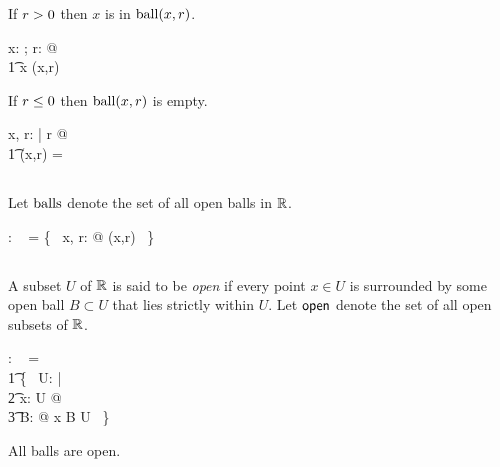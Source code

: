 \documentclass[11pt, oneside]{article}
\begin{document}
\begin{remark}
If $r \mathrel{>} 0$ then $x$ is in $\operatorname{ball}(x, r)$. 

\begin{zed}
	\forall x: \R; r: \Rpos @ \\
	\t1	x \in \ballR(x,r)
\end{zed}

\end{remark}

\begin{remark}
If $r \mathrel{\leq} 0$ then $\operatorname{ball}(x,r)$ is empty.

\begin{zed}
	\forall x, r: \R | r \leR \zeroR @ \\
	\t1	\ballR(x,r) = \emptyset
\end{zed}

\end{remark}

\subsection{}

Let $\operatorname{balls}$ denote the set of all open balls in $\mathbb{R}$.

\begin{axdef}
	\ballsR: \family~\R
\where
	\ballsR = \{~ x, r: \R @ \ballR(x,r) ~\}
\end{axdef}

\subsection{}

A subset $U$ of $\mathbb{R}$ is said to be {\it open} if every point $x \in U$ is surrounded by some open ball $B \subset U$ that lies
strictly within $U$.
Let $\mathsf{open}$ denote the set of all open subsets of $\mathbb{R}$.

\begin{axdef}
	\openR: \family~\R
\where
	\openR = \\
	\t1	\{~ U:  \power \R | \\
	\t2		\forall x: U @ \\
	\t3			\exists B: \ballsR @ x \in B \subset U ~\}
\end{axdef}

\begin{remark}
All balls are open.

\begin{zed}
	\ballsR \subset \openR
\end{zed}

\end{remark}
\end{document}
